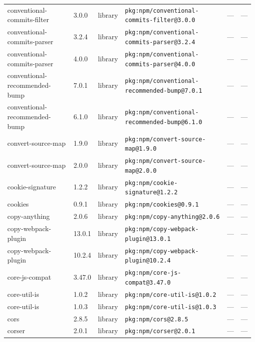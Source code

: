\documentclass[11pt,a4paper]{article}
\begin{document}
\begin{longtable}{|p{4cm}|p{2cm}|p{1.6cm}|p{5cm}|p{1.5cm}|p{3.5cm}|}
\raggedright conventional-commits-filter & 3.0.0 & library & \small\texttt{pkg:npm/conventional-commits-filter@3.0.0} & — & \small — \\
\raggedright conventional-commits-parser & 3.2.4 & library & \small\texttt{pkg:npm/conventional-commits-parser@3.2.4} & — & \small — \\
\raggedright conventional-commits-parser & 4.0.0 & library & \small\texttt{pkg:npm/conventional-commits-parser@4.0.0} & — & \small — \\
\raggedright conventional-recommended-bump & 7.0.1 & library & \small\texttt{pkg:npm/conventional-recommended-bump@7.0.1} & — & \small — \\
\raggedright conventional-recommended-bump & 6.1.0 & library & \small\texttt{pkg:npm/conventional-recommended-bump@6.1.0} & — & \small — \\
\raggedright convert-source-map & 1.9.0 & library & \small\texttt{pkg:npm/convert-source-map@1.9.0} & — & \small — \\
\raggedright convert-source-map & 2.0.0 & library & \small\texttt{pkg:npm/convert-source-map@2.0.0} & — & \small — \\
\raggedright cookie-signature & 1.2.2 & library & \small\texttt{pkg:npm/cookie-signature@1.2.2} & — & \small — \\
\raggedright cookies & 0.9.1 & library & \small\texttt{pkg:npm/cookies@0.9.1} & — & \small — \\
\raggedright copy-anything & 2.0.6 & library & \small\texttt{pkg:npm/copy-anything@2.0.6} & — & \small — \\
\raggedright copy-webpack-plugin & 13.0.1 & library & \small\texttt{pkg:npm/copy-webpack-plugin@13.0.1} & — & \small — \\
\raggedright copy-webpack-plugin & 10.2.4 & library & \small\texttt{pkg:npm/copy-webpack-plugin@10.2.4} & — & \small — \\
\raggedright core-js-compat & 3.47.0 & library & \small\texttt{pkg:npm/core-js-compat@3.47.0} & — & \small — \\
\raggedright core-util-is & 1.0.2 & library & \small\texttt{pkg:npm/core-util-is@1.0.2} & — & \small — \\
\raggedright core-util-is & 1.0.3 & library & \small\texttt{pkg:npm/core-util-is@1.0.3} & — & \small — \\
\raggedright cors & 2.8.5 & library & \small\texttt{pkg:npm/cors@2.8.5} & — & \small — \\
\raggedright corser & 2.0.1 & library & \small\texttt{pkg:npm/corser@2.0.1} & — & \small — \\

\end{longtable}
\end{document}
